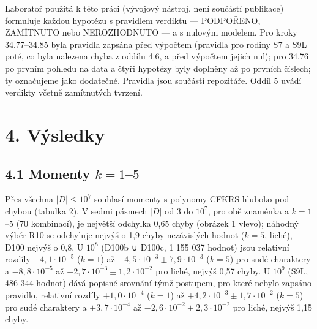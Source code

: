 \documentclass[
  10pt,
]{article}
\begin{document}
Laboratoř použitá k této práci (vývojový nástroj, není součástí
publikace) formuluje každou hypotézu s pravidlem verdiktu --- PODPOŘENO,
ZAMÍTNUTO nebo NEROZHODNUTO --- a s nulovým modelem. Pro kroky
34.77--34.85 byla pravidla zapsána před výpočtem (pravidla pro rodiny S7
a S9L poté, co byla nalezena chyba z oddílu 4.6, a před výpočtem jejich
nul); pro 34.76 po prvním pohledu na data a čtyři hypotézy byly doplněny
až po prvních číslech; ty označujeme jako dodatečné. Pravidla jsou
součástí repozitáře. Oddíl 5 uvádí verdikty včetně zamítnutých tvrzení.

\hypertarget{vuxfdsledky}{%
\section{4. Výsledky}\label{vuxfdsledky}}

\hypertarget{momenty-k-15}{%
\subsection{\texorpdfstring{4.1 Momenty
\(k = 1\)--\(5\)}{4.1 Momenty k = 1--5}}\label{momenty-k-15}}

Přes všechna \(|D| \le 10^7\) souhlasí momenty s polynomy CFKRS hluboko
pod chybou (tabulka 2). V sedmi pásmech \(|D|\) od 3 do \(10^7\), pro
obě znaménka a \(k = 1\)--\(5\) (70 kombinací), je největší odchylka
0,65 chyby (obrázek 1 vlevo); náhodný výběr R10 se odchyluje nejvýš o
1,9 chyby nezávislých hodnot (\(k = 5\), liché), D100 nejvýš o 0,8. U
\(10^8\) (D100b ∪ D100c, 1 155 037 hodnot) jsou relativní rozdíly
\(-4{,}1\cdot10^{-5}\) (\(k = 1\)) až
\(-4{,}5\cdot10^{-3} \pm 7{,}9\cdot10^{-3}\) (\(k = 5\)) pro sudé
charaktery a \(-8{,}8\cdot10^{-5}\) až
\(-2{,}7\cdot10^{-3} \pm 1{,}2\cdot10^{-2}\) pro liché, nejvýš 0,57
chyby. U \(10^9\) (S9L, 486 344 hodnot) dává popisné srovnání týmž
postupem, pro které nebylo zapsáno pravidlo, relativní rozdíly
\(+1{,}0\cdot10^{-4}\) (\(k = 1\)) až
\(+4{,}2\cdot10^{-3} \pm 1{,}7\cdot10^{-2}\) (\(k = 5\)) pro sudé
charaktery a \(+3{,}7\cdot10^{-4}\) až
\(-2{,}6\cdot10^{-2} \pm 2{,}3\cdot10^{-2}\) pro liché, nejvýš 1,15
chyby.
\end{document}
